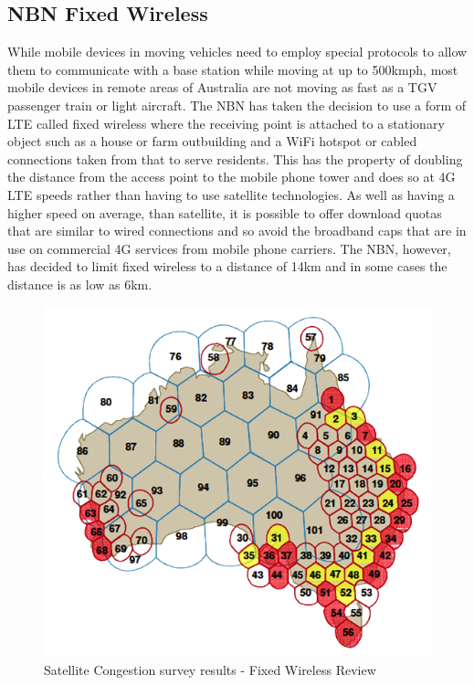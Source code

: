 \subsection{NBN Fixed Wireless}
While mobile devices in moving vehicles need to employ special protocols to allow them to communicate with a base station while moving at up to 500kmph, most mobile devices in remote areas of Australia are not moving as fast as a TGV passenger train or light aircraft. The NBN has taken the decision to use a form of LTE called fixed wireless where the receiving point is attached to a stationary object such as a house or farm outbuilding and a WiFi hotspot or cabled connections taken from that to serve residents. This has the property of doubling the distance from the access point to the mobile phone tower and does so at 4G LTE speeds rather than having to use satellite technologies. As well as having a higher speed on average, than satellite, it is possible to offer download quotas that are similar to wired connections and so avoid the broadband caps that are in use on commercial 4G services from mobile phone carriers. The NBN, however, has decided to limit fixed wireless to a distance of 14km and in some cases the distance is as low as 6km.\cite{RefWorks:331}

\begin{figure}[ht]
\centering
\includegraphics[scale=0.5]{figures/satellite-beamsFW.png}
\caption{Satellite Congestion survey results - Fixed Wireless Review}
\label{fig:satbeams}
\end{figure}

